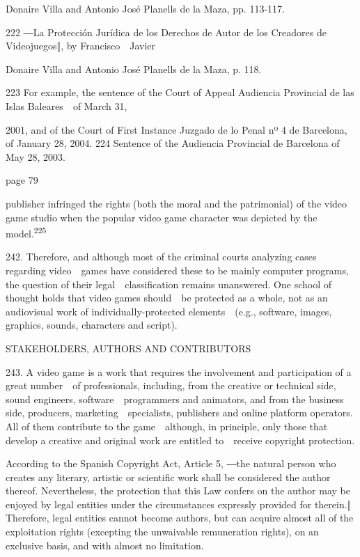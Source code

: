 \documentclass[
]{article}
\begin{document}
{Donaire Villa and Antonio José Planells de la Maza, pp. 113-117.}

{222 }{―}{La Protección Jurídica de los Derechos de Autor de los
Creadores de Videojuegos}{‖, by Francisco~~Javier}

{Donaire Villa and Antonio José Planells de la Maza, p. 118.}

{223 }{For example, the sentence of the Court of Appeal Audiencia
Provincial de las Islas Baleares~~of March 31,}

{2001, and of the Court of First Instance Juzgado de lo Penal nº 4 de
Barcelona, of January 28, 2004. }{224 }{Sentence of the Audiencia
Provincial de Barcelona of May 28, 2003.}

{page 79}

{publisher infringed the rights (both the moral and the patrimonial) of
the video game studio when the popular video game character was depicted
by the model.}\textsuperscript{{225}}

{242. }{Therefore, and although most of the criminal courts analyzing
cases regarding video~~games have considered these to be mainly computer
programs, the question of their legal~~classification remains
unanswered. One school of thought holds that video games should~~be
protected as a whole, not as an audiovisual work of
individually-protected elements~~(e.g., software, images, graphics,
sounds, characters and script).}

{STAKEHOLDERS, AUTHORS AND CONTRIBUTORS}

{243. }{A video game is a work that requires the involvement and
participation of a great number~~of professionals, including, from the
creative or technical side, sound engineers, software~~programmers and
animators, and from the business side, producers,
marketing~~specialists, publishers and online platform operators. All of
them contribute to the game~~although, in principle, only those that
develop a creative and original work are entitled to~~receive copyright
protection.}

{According to the Spanish }{Copyright Act}{, Article 5, }{―the natural
person who creates any }{literary, artistic or scientific work shall be
considered the author thereof. Nevertheless, the protection that this
Law confers on the author may be enjoyed by legal entities under the
}{circumstances expressly provided for therein.‖ }{Therefore, legal
entities cannot become }{authors}{, but can acquire almost all of the
exploitation rights (excepting the unwaivable remuneration rights), on
an exclusive basis, and with almost no limitation.}
\end{document}
